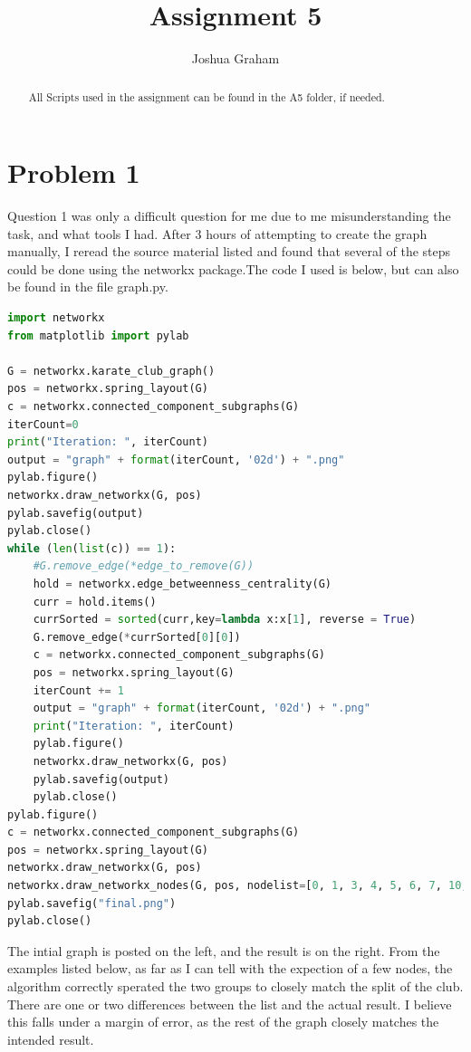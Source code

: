 \documentclass[11pt]{report}
\begin{document}
\title{Assignment 5}
\author{Joshua Graham}

\maketitle
\pagebreak
\begin{abstract}
All Scripts used in the assignment can be found in the A5 folder, if needed.

\end{abstract}
\section{Problem 1}
	Question 1 was only a difficult question for me due to me misunderstanding the task, and what tools I had. After 3 hours of attempting to create the graph manually, I reread the source material listed and found that several of the steps could be done using the networkx package.The code I used is below, but can also be found in the file graph.py.
	

\begin{lstlisting}[language=Python]
import networkx
from matplotlib import pylab

G = networkx.karate_club_graph()
pos = networkx.spring_layout(G)
c = networkx.connected_component_subgraphs(G)
iterCount=0
print("Iteration: ", iterCount)
output = "graph" + format(iterCount, '02d') + ".png"
pylab.figure()
networkx.draw_networkx(G, pos)
pylab.savefig(output)
pylab.close()
while (len(list(c)) == 1):
    #G.remove_edge(*edge_to_remove(G))
    hold = networkx.edge_betweenness_centrality(G)
    curr = hold.items()
    currSorted = sorted(curr,key=lambda x:x[1], reverse = True)
    G.remove_edge(*currSorted[0][0])
    c = networkx.connected_component_subgraphs(G)
    pos = networkx.spring_layout(G)
    iterCount += 1
    output = "graph" + format(iterCount, '02d') + ".png"
    print("Iteration: ", iterCount)
    pylab.figure()
    networkx.draw_networkx(G, pos)
    pylab.savefig(output)
    pylab.close()
pylab.figure()
c = networkx.connected_component_subgraphs(G)
pos = networkx.spring_layout(G)
networkx.draw_networkx(G, pos)
networkx.draw_networkx_nodes(G, pos, nodelist=[0, 1, 3, 4, 5, 6, 7, 10, 11, 12, 13, 16, 17, 19, 21], node_color='b')
pylab.savefig("final.png")
pylab.close()


\end{lstlisting}
\pagebreak

The intial graph is posted on the left, and the result is on the right. From the examples listed below, as far as I can tell with the expection of a few nodes, the algorithm correctly sperated the two groups to closely match the split of the club. There are one or two differences between the list and the actual result. I believe this falls under a margin of error, as the rest of the graph closely matches the intended result. 
\end{document}
